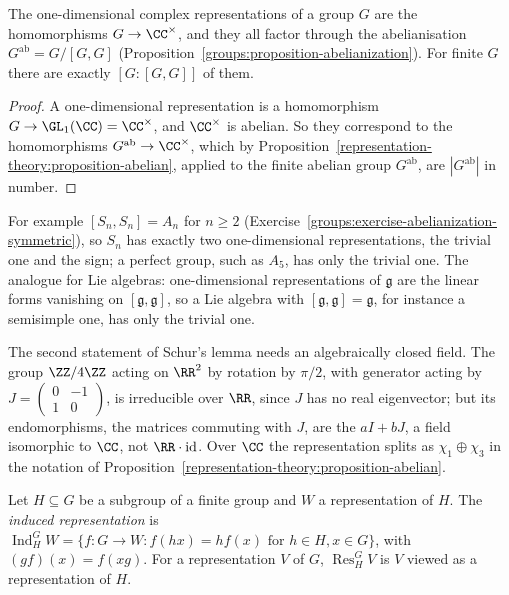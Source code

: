 \begin{corollary}\label{representation-theory:corollary-one-dimensional}
The one-dimensional complex representations of a group $G$ are the homomorphisms $G \to \CC^\times$, and they all factor through the abelianisation $G^{\mathrm{ab}} = G/[G, G]$
(Proposition~\ref{groups:proposition-abelianization}). For finite $G$ there are exactly $[G : [G, G]]$ of them.
\end{corollary}

\begin{proof}
A one-dimensional representation is a homomorphism $G \to \GL_1(\CC) = \CC^\times$, and $\CC^\times$ is abelian. So they correspond to the homomorphisms $G^{\mathrm{ab}} \to \CC^\times$, which by
Proposition~\ref{representation-theory:proposition-abelian}, applied to the finite abelian group $G^{\mathrm{ab}}$, are $|G^{\mathrm{ab}}|$ in number.
\end{proof}

For example $[S_n, S_n] = A_n$ for $n \geq 2$ (Exercise~\ref{groups:exercise-abelianization-symmetric}), so $S_n$ has exactly two one-dimensional representations, the trivial one and the sign; a
perfect group, such as $A_5$, has only the trivial one. The analogue for Lie algebras: one-dimensional representations of $\mathfrak{g}$ are the linear forms vanishing on $[\mathfrak{g}, \mathfrak{g}]$,
so a Lie algebra with $[\mathfrak{g}, \mathfrak{g}] = \mathfrak{g}$, for instance a semisimple one, has only the trivial one.

\begin{counterexample}\label{representation-theory:counterexample-schur-real}
The second statement of Schur's lemma needs an algebraically closed field. The group $\ZZ/4\ZZ$ acting on $\RR^2$ by rotation by $\pi/2$, with generator acting by $J = \begin{pmatrix}0 & -1\\ 1 & 0\end{pmatrix}$, is irreducible over $\RR$,
since $J$ has no real eigenvector; but its endomorphisms, the matrices commuting with $J$, are the $aI + bJ$, a field isomorphic to $\CC$, not $\RR\cdot\mathrm{id}$. Over $\CC$ the representation splits as $\chi_1 \oplus \chi_3$ in the notation of
Proposition~\ref{representation-theory:proposition-abelian}.
\end{counterexample}

\begin{definition}\label{representation-theory:definition-induced}
Let $H \subseteq G$ be a subgroup of a finite group and $W$ a representation of $H$. The \emph{induced representation} is
$\operatorname{Ind}_H^GW = \{f \colon G \to W : f(hx) = hf(x) \text{ for } h \in H, x \in G\}$, with $(gf)(x) = f(xg)$. For a representation $V$ of $G$, $\operatorname{Res}^G_HV$ is $V$ viewed as a representation of $H$.
\end{definition}

